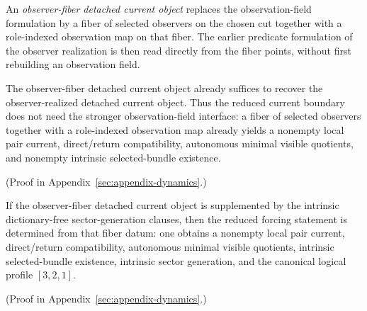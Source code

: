 \begin{definition}
\label{def:observer-fiber-detached-current-object}
An \emph{observer-fiber detached current object} replaces the
observation-field formulation by a fiber of selected observers on the chosen
cut together with a role-indexed observation map on that fiber. The earlier
predicate formulation of the observer realization is then read directly from
the fiber points, without first rebuilding an observation field.
\end{definition}

\begin{theorem}
\label{thm:observer-fiber-detached-current-object-recovers-the-observer-realized-surface}
The observer-fiber detached current object already suffices to recover the
observer-realized detached current object. Thus the reduced current boundary
does not need the stronger observation-field interface: a fiber of selected
observers together with a role-indexed observation map already yields a
nonempty local pair current, direct/return compatibility, autonomous minimal
visible quotients, and nonempty intrinsic selected-bundle existence.
\end{theorem}

(Proof in Appendix~\ref{sec:appendix-dynamics}.)

\begin{corollary}
\label{cor:observer-fiber-detached-current-sector-object-closes-the-reduced-seam}
If the observer-fiber detached current object is supplemented by the intrinsic
dictionary-free sector-generation clauses, then the reduced forcing statement
is determined from that fiber datum: one obtains a nonempty local pair
current, direct/return compatibility, autonomous minimal visible quotients,
intrinsic selected-bundle existence, intrinsic sector generation, and the
canonical logical profile \([3,2,1]\).
\end{corollary}

(Proof in Appendix~\ref{sec:appendix-dynamics}.)

